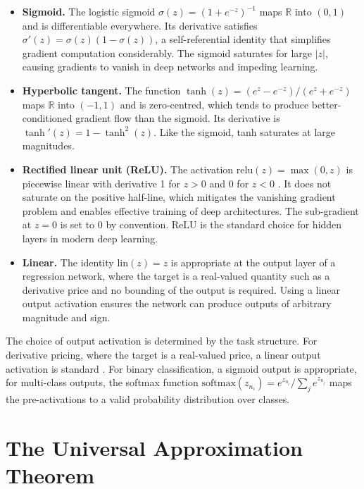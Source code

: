     \begin{itemize}
    \item \textbf{Sigmoid.} The logistic sigmoid $\sigma(z) = (1 + e^{-z})^{-1}$ maps $\mathbb{R}$ into $(0, 1)$ and is differentiable everywhere. Its derivative satisfies $\sigma'(z) = \sigma(z)(1 - \sigma(z))$, a self-referential identity that simplifies gradient computation considerably. The sigmoid saturates for large $|z|$, causing gradients to vanish in deep networks and impeding learning.

    \item \textbf{Hyperbolic tangent.} The function $\tanh(z) = (e^z - e^{-z})/(e^z + e^{-z})$ maps $\mathbb{R}$ into $(-1, 1)$ and is zero-centred, which tends to produce better-conditioned gradient flow than the sigmoid. Its derivative is $\tanh'(z) = 1 - \tanh^2(z)$. Like the sigmoid, tanh saturates at large magnitudes.

    \item \textbf{Rectified linear unit (ReLU).} The activation $\mathrm{relu}(z) = \max(0, z)$ is piecewise linear with derivative 1 for $z > 0$ and 0 for $z < 0$ \citep{glorot2011deep}. It does not saturate on the positive half-line, which mitigates the vanishing gradient problem and enables effective training of deep architectures. The sub-gradient at $z = 0$ is set to 0 by convention. ReLU is the standard choice for hidden layers in modern deep learning.

    \item \textbf{Linear.} The identity $\mathrm{lin}(z) = z$ is appropriate at the output layer of a regression network, where the target is a real-valued quantity such as a derivative price and no bounding of the output is required. Using a linear output activation ensures the network can produce outputs of arbitrary magnitude and sign.
    \end{itemize}

    \noindent
    The choice of output activation is determined by the task structure. For derivative pricing, where the target is a real-valued price, a linear output activation is standard \citep{ruf2020neural}. For binary classification, a sigmoid output is appropriate, for multi-class outputs, the softmax function $\mathrm{softmax}(z_{n_i}) = e^{z_{n_i}} / \sum_{j} e^{z_{n_j}}$ maps the pre-activations to a valid probability distribution over classes.

    \section*{The Universal Approximation Theorem}

